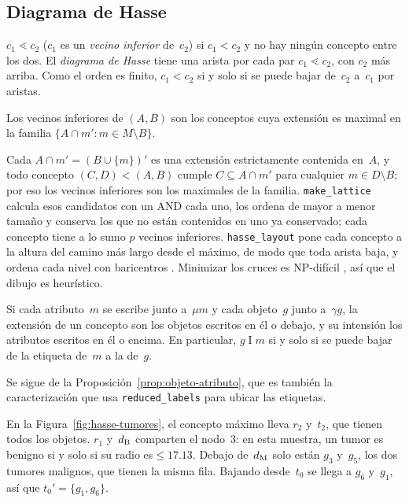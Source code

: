 \subsection{Diagrama de Hasse}
\label{sec:hasse}

\begin{definicion}[cobertura]\label{def:cobertura}
$c_1 \lessdot c_2$ ($c_1$ es un \emph{vecino inferior} de~$c_2$) si $c_1 < c_2$ y no hay ningún concepto entre los dos. El \emph{diagrama de Hasse} tiene una arista por cada par $c_1 \lessdot c_2$, con $c_2$ más arriba. Como el orden es finito, $c_1 < c_2$ si y solo si se puede bajar de~$c_2$ a~$c_1$ por aristas.
\end{definicion}

\begin{proposicion}\label{prop:vecinos}
Los vecinos inferiores de $(A, B)$ son los conceptos cuya extensión es maximal en la familia $\{ A \cap m' : m \in M \setminus B \}$.
\end{proposicion}

Cada $A \cap m' = (B \cup \{m\})'$ es una extensión estrictamente contenida en~$A$, y todo concepto $(C, D) < (A, B)$ cumple $C \subseteq A \cap m'$ para cualquier $m \in D \setminus B$; por eso los vecinos inferiores son los maximales de la familia. \texttt{make\_lattice} calcula esos candidatos con un AND cada uno, los ordena de mayor a menor tamaño y conserva los que no están contenidos en uno ya conservado; cada concepto tiene a lo sumo $p$ vecinos inferiores. \texttt{hasse\_layout} pone cada concepto a la altura del camino más largo desde el máximo, de modo que toda arista baja, y ordena cada nivel con baricentros \parencite{sugiyama1981}. Minimizar los cruces es NP-difícil \parencite{eades1994}, así que el dibujo es heurístico.

\begin{proposicion}\label{prop:lectura}
Si cada atributo~$m$ se escribe junto a~$\mu m$ y cada objeto~$g$ junto a~$\gamma g$, la extensión de un concepto son los objetos escritos en él o debajo, y su intensión los atributos escritos en él o encima. En particular, $g \mathrel{I} m$ si y solo si se puede bajar de la etiqueta de~$m$ a la de~$g$.
\end{proposicion}

Se sigue de la Proposición~\ref{prop:objeto-atributo}, que es también la caracterización que usa \texttt{reduced\_labels} para ubicar las etiquetas.

\begin{ejemplo}\label{ej:hasse}
En la Figura~\ref{fig:hasse-tumores}, el concepto máximo lleva $r_2$ y~$t_2$, que tienen todos los objetos. $r_1$ y~$d_{\mathrm{B}}$ comparten el nodo~3: en esta muestra, un tumor es benigno si y solo si su radio es${}\le 17.13$. Debajo de~$d_{\mathrm{M}}$ solo están $g_3$ y~$g_5$, los dos tumores malignos, que tienen la misma fila. Bajando desde~$t_0$ se llega a $g_6$ y~$g_1$, así que $t_0' = \{g_1, g_6\}$.
\end{ejemplo}

